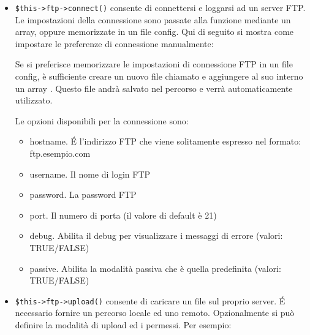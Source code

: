 \begin{itemize}
\item \verb|$this->ftp->connect()| consente di connettersi e loggarsi ad un server FTP. Le impostazioni della connessione sono passate alla funzione mediante un array, oppure memorizzate in un file config. Qui di seguito si mostra come impostare le preferenze di connessione manualmente:


Se si preferisce memorizzare le impostazioni di connessione FTP in un file config, è sufficiente creare un nuovo file chiamato  e aggiungere al suo interno un array . Questo file andrà salvato nel percorso  e verrà automaticamente utilizzato.

Le opzioni disponibili per la connessione sono:

\begin{itemize}
\item hostname. \'E l'indirizzo FTP che viene solitamente espresso nel formato: ftp.esempio.com
\item username. Il nome di login FTP
\item password. La password FTP
\item port. Il numero di porta (il valore di default è 21)
\item debug. Abilita il debug per visualizzare i messaggi di errore (valori: TRUE/FALSE)
\item passive. Abilita la modalità passiva che è quella predefinita (valori: TRUE/FALSE)
\end{itemize}

\item \verb|$this->ftp->upload()| consente di caricare un file sul proprio server. \'E necessario fornire un percorso locale ed uno remoto. Opzionalmente si può definire la modalità di upload ed i permessi. Per esempio:



\end{itemize}

